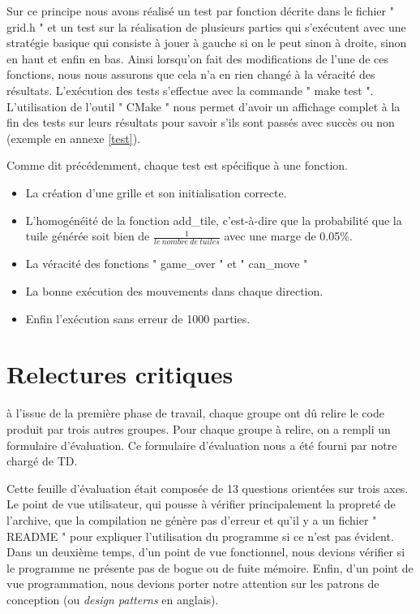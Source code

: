 \documentclass[12pt]{article}
\begin{document}
\par Sur ce principe nous avons réalisé un test par fonction décrite dans
le fichier " grid.h " et un test sur la réalisation de plusieurs parties
qui s'exécutent avec une stratégie basique qui consiste à jouer à gauche
si on le peut sinon à droite, sinon en haut et enfin en bas. Ainsi lorsqu'on fait
des modifications de l'une de ces fonctions, nous nous assurons que cela n'a en
rien changé à la véracité des résultats. L'exécution des tests
s'effectue avec la commande " make test ". L'utilisation de l'outil " CMake " nous permet d'avoir un affichage complet à la fin des tests sur leurs résultats pour savoir s'ils sont passés avec succès
ou non (exemple en annexe \ref{test}).

\par Comme dit précédemment, chaque test est spécifique à une fonction.
\begin{itemize}
  \item La création d'une grille et son initialisation correcte.
  \item L'homogénéité de la fonction add\_tile, c'est-à-dire que la
  probabilité que la tuile générée soit bien de $
  \frac{1}{le\ nombre\ de\ tuiles} $ avec une marge de 0.05\%.
  \item La véracité des fonctions " game\_over " et " can\_move
  "
  \item La bonne exécution des mouvements dans chaque direction.
  \item Enfin l'exécution sans erreur de 1000 parties.
\end{itemize}

\newpage
\section{Relectures critiques}
à l’issue de la première phase de travail, chaque groupe ont dû relire le
code produit par trois autres groupes. Pour chaque groupe à relire, on a
rempli un formulaire d’évaluation. Ce formulaire d’évaluation nous a été
fourni par notre chargé de TD.

\par Cette feuille d'évaluation était composée de 13 questions orientées
sur trois axes. Le point de vue utilisateur, qui pousse à vérifier
principalement la propreté de l'archive, que la compilation ne génère pas
d'erreur et qu'il y a un fichier " README " pour expliquer l'utilisation
du programme si ce n'est pas évident. Dans un deuxième temps, d'un point de
vue fonctionnel, nous devions vérifier si le programme ne présente pas de
bogue ou de fuite mémoire. Enfin, d'un point de vue programmation, nous
devions porter notre attention sur les patrons de conception (ou \textit{design
patterns} en anglais).
\end{document}

